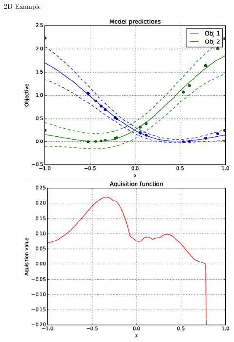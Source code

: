 \documentclass[final]{beamer}
\newlength{\twocolwid}
\begin{document}
\begin{frame}[t]
\begin{columns}[t]
\begin{column}{\twocolwid}
\begin{alertblock}{2D Example}

\begin{figure}
\centering
\begin{minipage}{.33\textwidth}
  \centering
  \includegraphics[width=\linewidth]{optimizer/model.eps}
\end{minipage}%
\begin{minipage}{.33\textwidth}
  \centering
  \includegraphics[width=\linewidth]{optimizer/aquisition.eps}
\end{minipage}
\begin{minipage}{.33\textwidth}
  \centering

\end{minipage}
\end{figure}
\end{alertblock}
\end{column}
\end{columns}
\end{frame}
\end{document}
